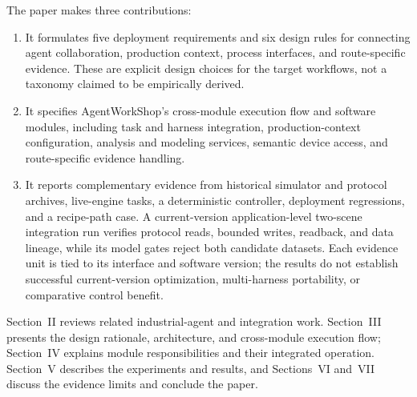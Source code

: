 The paper makes three contributions:
\begin{enumerate}
\item It formulates five deployment requirements and six design rules for
  connecting agent collaboration, production context, process interfaces, and
  route-specific evidence. These are explicit design choices for the target
  workflows, not a taxonomy claimed to be empirically derived.
\item It specifies AgentWorkShop's cross-module execution flow and software
  modules, including task and harness integration, production-context
  configuration, analysis and modeling services, semantic device access, and
  route-specific evidence handling.
\item It reports complementary evidence from historical simulator and
  protocol archives, live-engine tasks, a deterministic controller,
  deployment regressions, and a recipe-path case. A current-version
  application-level two-scene integration run verifies protocol reads, bounded writes,
  readback, and data lineage, while its model gates reject both candidate
  datasets. Each evidence unit is tied to its interface and software
  version; the results do not establish successful current-version
  optimization, multi-harness portability, or comparative control benefit.
\end{enumerate}

Section~II reviews related industrial-agent and integration work.
Section~III presents the design rationale, architecture, and cross-module
execution flow; Section~IV explains module responsibilities and their
integrated operation. Section~V describes the experiments and results, and
Sections~VI and~VII discuss the evidence limits and conclude the paper.
